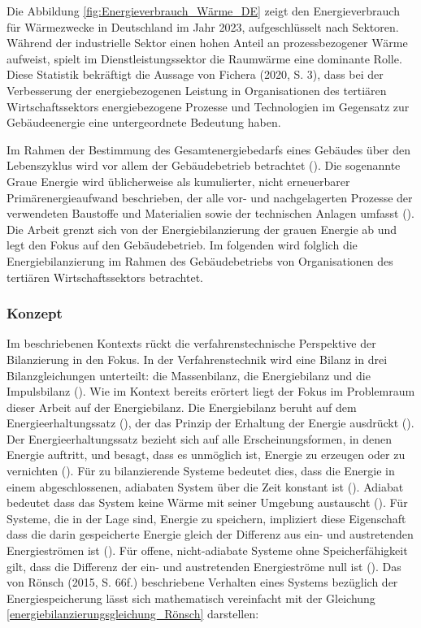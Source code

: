 Die Abbildung \ref{fig:Energieverbrauch_Wärme_DE} zeigt den Energieverbrauch für Wärmezwecke in Deutschland im Jahr 2023, aufgeschlüsselt nach Sektoren. 
Während der industrielle Sektor einen hohen Anteil an prozessbezogener Wärme aufweist, 
spielt im Dienstleistungssektor die Raumwärme eine dominante Rolle.
Diese Statistik bekräftigt die Aussage von Fichera (2020, S. 3), dass bei der Verbesserung der energiebezogenen Leistung in Organisationen des tertiären 
Wirtschaftssektors energiebezogene Prozesse und Technologien im Gegensatz zur Gebäudeenergie eine untergeordnete Bedeutung haben.

Im Rahmen der Bestimmung des Gesamtenergiebedarfs eines Gebäudes über den Lebenszyklus wird vor allem der Gebäudebetrieb betrachtet (\cite[S. 133]{Musall.2015}).
Die sogenannte Graue Energie wird üblicherweise als kumulierter, nicht erneuerbarer Primärenergieaufwand beschrieben, der alle vor- und nachgelagerten Prozesse 
der verwendeten Baustoffe und Materialien sowie der technischen Anlagen umfasst (\cite[S. 133]{Musall.2015}). 
Die Arbeit grenzt sich von der Energiebilanzierung der grauen Energie ab und legt den Fokus auf den Gebäudebetrieb.
Im folgenden wird folglich die Energiebilanzierung im Rahmen des Gebäudebetriebs von Organisationen des tertiären Wirtschaftssektors 
betrachtet.


\subsubsection{Konzept}
Im beschriebenen Kontexts rückt die verfahrenstechnische Perspektive der Bilanzierung in den Fokus. 
In der Verfahrenstechnik wird eine Bilanz in drei Bilanzgleichungen unterteilt: die Massenbilanz, die Energiebilanz und die Impulsbilanz (\cite[S. 66]{Rönsch.2015}).
Wie im Kontext bereits erörtert liegt der Fokus im Problemraum dieser Arbeit auf der Energiebilanz.
Die Energiebilanz beruht auf dem Energieerhaltungssatz (\cite[S. 66]{Rönsch.2015}), der das Prinzip der Erhaltung der Energie ausdrückt 
(\cite[S. 57]{Baehr.1966}). 
Der Energieerhaltungssatz bezieht sich auf alle Erscheinungsformen, in denen Energie auftritt, und besagt, dass es 
unmöglich ist, Energie zu erzeugen oder zu vernichten (\cite[S. 57]{Baehr.1966}).
Für zu bilanzierende Systeme bedeutet dies, dass die Energie in einem abgeschlossenen, adiabaten System über die Zeit konstant ist 
(\cite[S. 66]{Rönsch.2015}). 
Adiabat bedeutet dass das System keine Wärme mit seiner Umgebung austauscht (\cite[S. 66]{Rönsch.2015}).
Für Systeme, die in der Lage sind, Energie zu speichern, impliziert diese Eigenschaft dass die darin gespeicherte Energie gleich der 
Differenz aus ein- und austretenden Energieströmen ist (\cite[S. 66f.]{Rönsch.2015}).
Für offene, nicht-adiabate Systeme ohne Speicherfähigkeit gilt, dass die Differenz der ein- und austretenden Energieströme null ist (\cite[S. 66f.]{Rönsch.2015}).
Das von Rönsch (2015, S. 66f.) beschriebene Verhalten eines Systems bezüglich der Energiespeicherung lässt sich mathematisch vereinfacht mit der Gleichung 
\eqref{energiebilanzierungsgleichung_Rönsch} darstellen:

